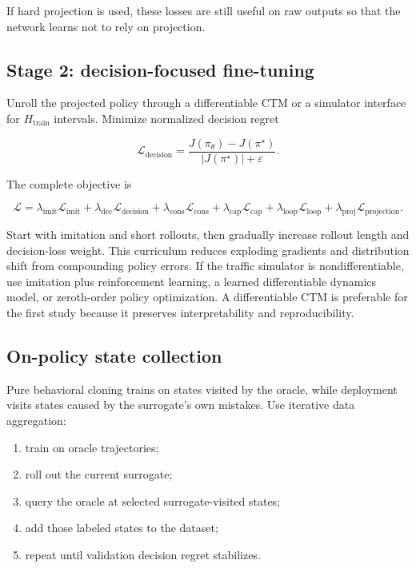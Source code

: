 \documentclass[11pt]{article}
\begin{document}
If hard projection is used, these losses are still useful on raw outputs so that the
network learns not to rely on projection.

\subsection{Stage 2: decision-focused fine-tuning}

Unroll the projected policy through a differentiable CTM or a simulator interface for
\(H_{\mathrm{train}}\) intervals.  Minimize normalized decision regret

\begin{equation}
  \mathcal{L}_{\mathrm{decision}}
  = \frac{J(\pi_\theta)-J(\pi^\star)}
         {|J(\pi^\star)|+\varepsilon}.
  \label{eq:decision-loss}
\end{equation}

The complete objective is

\begin{equation}
  \mathcal{L}
  = \lambda_{\mathrm{imit}}\mathcal{L}_{\mathrm{imit}}
  + \lambda_{\mathrm{dec}}\mathcal{L}_{\mathrm{decision}}
  + \lambda_{\mathrm{cons}}\mathcal{L}_{\mathrm{cons}}
  + \lambda_{\mathrm{cap}}\mathcal{L}_{\mathrm{cap}}
  + \lambda_{\mathrm{loop}}\mathcal{L}_{\mathrm{loop}}
  + \lambda_{\mathrm{proj}}\mathcal{L}_{\mathrm{projection}}.
  \label{eq:total-loss}
\end{equation}

Start with imitation and short rollouts, then gradually increase rollout length and
decision-loss weight.  This curriculum reduces exploding gradients and distribution
shift from compounding policy errors.  If the traffic simulator is nondifferentiable,
use imitation plus reinforcement learning, a learned differentiable dynamics model, or
zeroth-order policy optimization.  A differentiable CTM is preferable for the first
study because it preserves interpretability and reproducibility.

\subsection{On-policy state collection}

Pure behavioral cloning trains on states visited by the oracle, while deployment visits
states caused by the surrogate's own mistakes.  Use iterative data aggregation:

\begin{enumerate}[leftmargin=1.5em]
  \item train on oracle trajectories;
  \item roll out the current surrogate;
  \item query the oracle at selected surrogate-visited states;
  \item add those labeled states to the dataset;
  \item repeat until validation decision regret stabilizes.
\end{enumerate}
\end{document}
